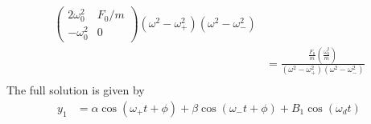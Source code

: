 \begin{sol}
\begin{enumerate}[label=\textbf{(\alph*)}]
\begin{align*}
{\begin{pmatrix}
    2\omega_0^2 & F_0/m \\
    -\omega_0^2 & 0
    \end{pmatrix}}{(\omega^2 - \omega_{+}^2)(\omega^2 - \omega_{-}^2)} \\
    &= \frac{\frac{F_0}{m}\left(\frac{\omega_0^2}{m}\right)}{(\omega^2 - \omega_{+}^2)(\omega^2 - \omega_{-}^2)} \\
\end{align*}
The full solution is given by 
\begin{align*}
    y_1 &= \alpha \cos (\omega_{+}t + \phi) + \beta \cos (\omega_{-}t + \phi) + B_1 \cos (\omega_d t)
\end{align*}
\end{enumerate}
\end{sol}